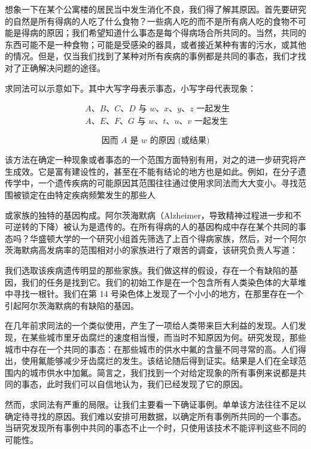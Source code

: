 想象一下在某个公寓楼的居民当中发生消化不良，我们得了解其原因。首先要研究的自然是所有得病的人吃了什么食物？一些病人吃的而不是所有病人吃的食物不可能是得病的原因；我们希望知道什么事态是每个得病场合所共同的。当然，共同的东西可能不是一种食物；可能是受感染的器具，或者接近某种有害的污水，或其他的情况。但是，仅当我们找到了某种对所有疾病的事例都是共同的事态，我们才找对了正确解决问题的途径。

求同法可以示意如下。其中大写字母表示事态，小写字母代表现象：

$$
\begin{aligned}
& A 、 B 、 C 、 D \text { 与 } w 、 x 、 y 、 z \text { 一起发生 } \\
& A 、 E 、 F 、 G \text { 与 } w 、 t 、 u 、 v \text { 一起发生 }
\end{aligned}
$$

$$
\text { 因而 } A \text { 是 } w \text { 的原因 (或结果) }
$$

该方法在确定一种现象或者事态的一个范围方面特别有用，对之的进一步研究将产生成效。它是富有建设性的，甚至在不能有结论的地方也是如此。例如，在分子遗传学中，一个遗传疾病的可能原因其范围往往通过使用求同法而大大变小。寻找范围被锁定在由特定疾病频繁发生的那些人

或家族的独特的基因构成。阿尔茨海默病（Alzheimer，导致精神过程进一步和不可逆转的下降）被认为是遗传的。在所有得病的人的基因构成中存在某个共同的事态吗？华盛顿大学的一个研究小组首先筛选了上百个得病家族，然后，对一个阿尔茨海默病高发病率的范围相对小的家族进行了艰苦的调查，该研究负责人写道：

\begin{displayquote}
我们选取该疾病遗传明显的那些家族。我们做这样的假设，存在一个有缺陷的基因，我们的任务是找到它。我们的初始工作是在一个包含所有人类染色体的大草堆中寻找一根针。我们在第 14 号染色体上发现了一个小小的地方，在那里存在一个引起阿尔茨海默病的有缺陷的基因。\cite{tanzi1996}
\end{displayquote}

在几年前求同法的一个类似使用，产生了一项给人类带来巨大利益的发现。人们发现，在某些城市里牙齿腐烂的速度相当慢，而当时不知原因为何。研究发现，那些城市中存在一个共同的事态：在那些城市的供水中氟的含量不同寻常的高。人们得出，使用氟能够减少牙齿腐烂的发生。该结论随后得到证实。结果是人们在全球范围内的城市供水中加氟。简言之，我们找到一个对给定现象的所有事例来说都是共同的事态，此时我们可以自信地认为，我们已经发现了它的原因。

然而，求同法有严重的局限。让我们主要看一下确证事例。单单该方法往往不足以确定待寻找的原因。我们难以安排可用数据，以确定所有事例所共同的一个事态。当研究发现所有事例中共同的事态不止一个时，只使用该技术不能评判这些不同的可能性。

